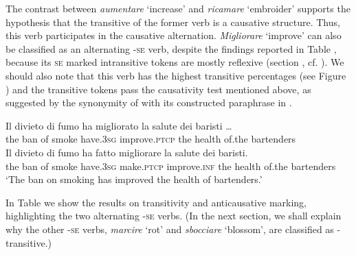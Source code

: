 \documentclass[output=paper,colorlinks,citecolor=brown
]{langscibook}
\begin{document}
The contrast between \textit{aumentare} ‘increase’ and \textit{ricamare} ‘embroider’ supports the hypothesis that the transitive of the former verb is a causative structure. Thus, this verb participates in the causative alternation. 
\textit{Migliorare} ‘improve’ can also be classified as an alternating -\textsc{se} verb, despite the findings reported in Table , because its \textsc{se} marked intransitive tokens are mostly reflexive (section , cf. ). We should also note that this verb has the highest transitive percentages (see Figure ) and the transitive tokens pass the causativity test mentioned above, as suggested by the synonymity of  with its constructed paraphrase in .

\ea \label{bentley_example_12}
    \ea \label{bentley_example_12a}
    \gll 	Il		divieto		di		fumo		ha							migliorato				la		salute		dei				baristi \ldots  \\
    						the	ban				of		smoke	have.3\textsc{sg}		improve.\textsc{ptcp}		the	health	of.the		bartenders				\\
    \ex \label{bentley_example_12b}
    \gll Il		divieto		di		fumo		ha							fatto						migliorare 	la 	salute 	dei			 baristi. \\
   	the	ban				of		smoke	have.3\textsc{sg}		make.\textsc{ptcp}	improve.\textsc{inf}	the	health	of.the		bartenders \\
    \glt 					‘The ban on smoking has improved the health of bartenders.’
    \z
\z

In Table  we show the results on transitivity and anticausative marking, highlighting the two alternating -\textsc{se} verbs. (In the next section, we shall explain why the other -\textsc{se} verbs, \textit{marcire} ‘rot’ and \textit{sbocciare} ‘blossom’, are classified as -transitive.)
\end{document}
